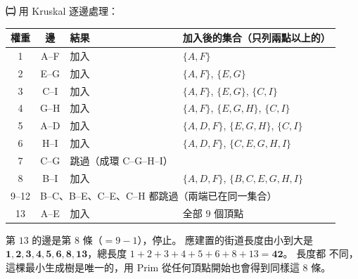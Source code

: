 \begin{pastsoln}
\textbf{㈡} 用 Kruskal 逐邊處理：
\begin{center}
\small
\begin{tabular}{ccll}
\toprule
權重 & 邊 & 結果 & 加入後的集合（只列兩點以上的） \\
\midrule
1 & A--F & 加入 & $\{A, F\}$ \\
2 & E--G & 加入 & $\{A, F\}$, $\{E, G\}$ \\
3 & C--I & 加入 & $\{A, F\}$, $\{E, G\}$, $\{C, I\}$ \\
4 & G--H & 加入 & $\{A, F\}$, $\{E, G, H\}$, $\{C, I\}$ \\
5 & A--D & 加入 & $\{A, D, F\}$, $\{E, G, H\}$, $\{C, I\}$ \\
6 & H--I & 加入 & $\{A, D, F\}$, $\{C, E, G, H, I\}$ \\
7 & C--G & 跳過（成環 C--G--H--I） & \\
8 & B--I & 加入 & $\{A, D, F\}$, $\{B, C, E, G, H, I\}$ \\
9--12 & \multicolumn{3}{l}{B--C、B--E、C--E、C--H 都跳過（兩端已在同一集合）} \\
13 & A--E & 加入 & 全部 $9$ 個頂點 \\
\bottomrule
\end{tabular}
\end{center}
第 $13$ 的邊是第 $8$ 條（$= 9 - 1$），停止。 應建置的街道長度由小到大是
$\mathbf{1, 2, 3, 4, 5, 6, 8, 13}$，總長度 $1 + 2 + 3 + 4 + 5 + 6 + 8 + 13 = \mathbf{42}$。 長度都
不同，這棵最小生成樹是唯一的，用 Prim 從任何頂點開始也會得到同樣這 $8$ 條。
\begin{center}
\end{center}


\end{pastsoln}
